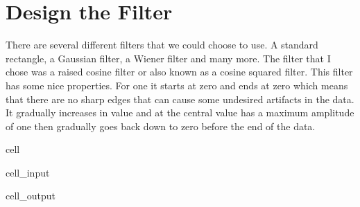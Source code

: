 \documentclass[letterpaper,10pt,english]{jupyterBook}
\begin{document}
\section{Design the Filter}
\label{\detokenize{content/0_project_part2:design-the-filter}}
\sphinxAtStartPar
There are several different filters that we could choose to use. A standard rectangle, a Gaussian filter, a Wiener filter and many more. The filter that I chose was a raised cosine filter or also known as a cosine squared filter. This filter has some nice properties. For one it starts at zero and ends at zero which means that there are no sharp edges that can cause some undesired artifacts in the data. It gradually increases in value and at the central value has a maximum amplitude of one then gradually goes back down to zero before the end of the data.

\begin{sphinxuseclass}{cell}\begin{sphinxVerbatimInput}

\begin{sphinxuseclass}{cell_input}
\begin{sphinxVerbatim}[commandchars=\\\{\}]
        
    

   
 
\end{sphinxVerbatim}

\end{sphinxuseclass}\end{sphinxVerbatimInput}
\begin{sphinxVerbatimOutput}

\begin{sphinxuseclass}{cell_output}
\noindent{}

\end{sphinxuseclass}\end{sphinxVerbatimOutput}

\end{sphinxuseclass}
\end{document}
